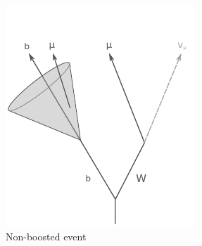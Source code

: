 \begin{figure}[t]
  \begin{subfigure}[b]{0.45\textwidth}
    \includegraphics[width=\textwidth]{PartBoosted/Plots/NonBoosted.pdf}
    \caption{Non-boosted event} \label{fig:NonBoostedDiagram}
  \end{subfigure}%
  ~ 
  \begin{subfigure}[b]{0.45\textwidth}

\end{subfigure}
\end{figure}
